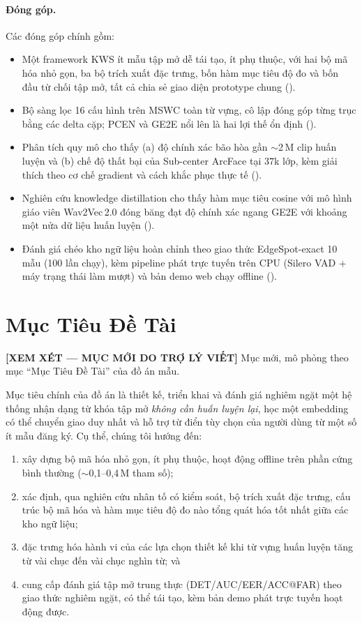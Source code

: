 \documentclass[12pt,a4paper]{report}
\newcommand{\reviewnote}[1]{%
  \par\smallskip\noindent
  \colorbox{yellow!35}{\parbox{0.97\linewidth}{\small\textbf{[XEM XÉT — MỤC MỚI DO TRỢ LÝ VIẾT]}\; #1}}%
  \par\smallskip}
\begin{document}
\paragraph{Đóng góp.} Các đóng góp chính gồm:
\begin{itemize}[leftmargin=1.4em,itemsep=2pt]
\item Một framework KWS ít mẫu tập mở dễ tái tạo, ít phụ thuộc, với hai bộ mã
hóa nhỏ gọn, ba bộ trích xuất đặc trưng, bốn hàm mục tiêu độ đo và bốn đầu từ
chối tập mở, tất cả chia sẻ giao diện prototype chung ().
\item Bộ sàng lọc 16 cấu hình trên MSWC toàn từ vựng, cô lập đóng góp từng trục
bằng các delta cặp; PCEN và GE2E nổi lên là hai lợi thế ổn định
().
\item Phân tích quy mô cho thấy (a) độ chính xác bão hòa gần $\sim$2\,M clip huấn
luyện và (b) chế độ thất bại của Sub-center ArcFace tại $37$k lớp, kèm giải thích
theo cơ chế gradient và cách khắc phục thực tế ().
\item Nghiên cứu knowledge distillation cho thấy hàm mục tiêu cosine với mô hình
giáo viên Wav2Vec\,2.0 đóng băng đạt độ chính xác ngang GE2E với khoảng một nửa
dữ liệu huấn luyện ().
\item Đánh giá chéo kho ngữ liệu hoàn chỉnh theo giao thức EdgeSpot-exact 10
mẫu (100 lần chạy), kèm pipeline phát trực tuyến trên CPU (Silero VAD + máy
trạng thái làm mượt) và bản demo web chạy offline ().
\end{itemize}

\section{Mục Tiêu Đề Tài}\label{sec:objectives}
\reviewnote{Mục mới, mô phỏng theo mục ``Mục Tiêu Đề Tài'' của đồ án mẫu.}

Mục tiêu chính của đồ án là thiết kế, triển khai và đánh giá nghiêm ngặt một hệ
thống nhận dạng từ khóa tập mở \emph{không cần huấn luyện lại}, học một embedding
có thể chuyển giao duy nhất và hỗ trợ từ điển tùy chọn của người dùng từ một số
ít mẫu đăng ký. Cụ thể, chúng tôi hướng đến:
\begin{enumerate}[leftmargin=1.5em,itemsep=2pt]
\item xây dựng bộ mã hóa nhỏ gọn, ít phụ thuộc, hoạt động offline trên phần cứng
bình thường ($\sim$0{,}1--0{,}4\,M tham số);
\item xác định, qua nghiên cứu nhân tố có kiểm soát, bộ trích xuất đặc trưng, cấu
trúc bộ mã hóa và hàm mục tiêu độ đo nào tổng quát hóa tốt nhất giữa các kho ngữ
liệu;
\item đặc trưng hóa hành vi của các lựa chọn thiết kế khi từ vựng huấn luyện tăng
từ vài chục đến vài chục nghìn từ; và
\item cung cấp đánh giá tập mở trung thực (DET/AUC/EER/ACC@FAR) theo giao thức
nghiêm ngặt, có thể tái tạo, kèm bản demo phát trực tuyến hoạt động được.
\end{enumerate}
\end{document}
